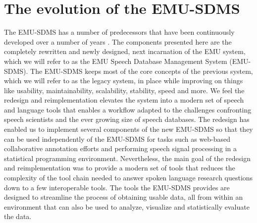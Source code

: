 \documentclass[]{book}
\theoremstyle{definition}
\theoremstyle{definition}
\theoremstyle{definition}
\theoremstyle{remark}
\begin{document}
\section{The evolution of the
EMU-SDMS}\label{the-evolution-of-the-emu-sdms}

The EMU-SDMS has a number of predecessors that have been continuously
developed over a number of years \citep[e.g.,][\citet{cassidy:1996a},
\citet{cassidy:sc2001a}, \citet{bombien:2006a},
\citet{harrington:2010a}, \citet{john:2012a}]{harrington:csl1993a}. The
components presented here are the completely rewritten and newly
designed, next incarnation of the EMU system, which we will refer to as
the EMU Speech Database Management System (EMU-SDMS). The EMU-SDMS keeps
most of the core concepts of the previous system, which we will refer to
as the legacy system, in place while improving on things like usability,
maintainability, scalability, stability, speed and more. We feel the
redesign and reimplementation elevates the system into a modern set of
speech and language tools that enables a workflow adapted to the
challenges confronting speech scientists and the ever growing size of
speech databases. The redesign has enabled us to implement several
components of the new EMU-SDMS so that they can be used independently of
the EMU-SDMS for tasks such as web-based collaborative annotation
efforts and performing speech signal processing in a statistical
programming environment. Nevertheless, the main goal of the redesign and
reimplementation was to provide a modern set of tools that reduces the
complexity of the tool chain needed to answer spoken language research
questions down to a few interoperable tools. The tools the EMU-SDMS
provides are designed to streamline the process of obtaining usable
data, all from within an environment that can also be used to analyze,
visualize and statistically evaluate the data.
\end{document}
